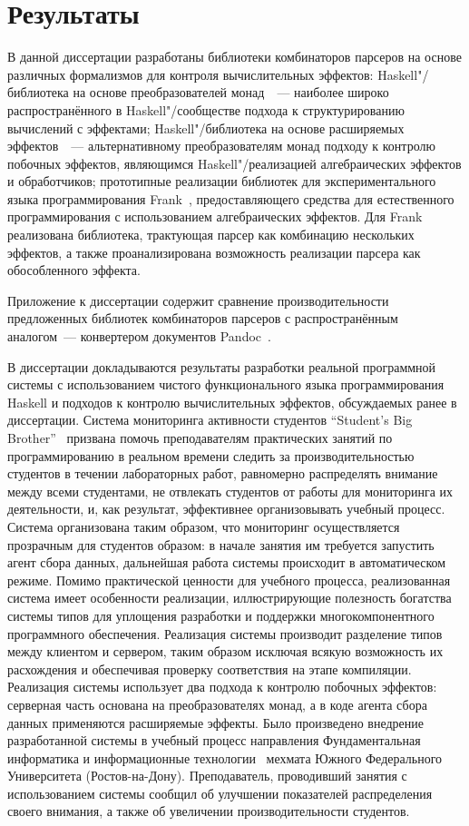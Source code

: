 \documentclass [fontsize=14pt, paper=a4, pagesize, DIV=calc]%
{article}
\begin{document}
\section{Результаты}

В данной диссертации разработаны библиотеки комбинаторов парсеров на основе
различных формализмов для контроля вычислительных эффектов: Haskell"/библиотека на
основе преобразователей монад~\cite{mdParse}~--- наиболее широко распространённого
в Haskell"/сообществе подхода к структурированию вычислений с эффектами; Haskell"/библиотека
на основе расширяемых эффектов~\cite{extEffParsers}~---
альтернативному преобразователям монад подходу к контролю
побочных эффектов, являющимся Haskell"/реализацией алгебраических эффектов и обработчиков;
прототипные реализации библиотек для экспериментального языка программирования
Frank~\cite{frankoparsec}, предоставляющего средства для естественного программирования
с использованием алгебраических эффектов. Для Frank реализована библиотека, трактующая
парсер как комбинацию нескольких эффектов, а также проанализирована возможность
реализации парсера как обособленного эффекта.

Приложение к диссертации содержит сравнение производительности
предложенных библиотек комбинаторов парсеров с распространённым аналогом~--- конвертером
документов Pandoc~\cite{pandoc}.

В диссертации докладываются результаты разработки реальной программной
системы с использованием чистого функционального языка программирования Haskell и
подходов к контролю вычислительных эффектов, обсуждаемых ранее в диссертации.
Система мониторинга активности студентов ``Student's Big Brother''~\cite{sbbRepo}
призвана помочь преподавателям практических занятий по программированию
в реальном времени следить за производительностью студентов в течении лабораторных
работ, равномерно распределять
внимание между всеми студентами, не отвлекать студентов от работы для мониторинга
их деятельности, и, как результат, эффективнее организовывать учебный процесс.
Система организована таким образом, что мониторинг осуществляется прозрачным для
студентов образом: в начале занятия им требуется запустить агент сбора данных, дальнейшая
работа системы происходит в автоматическом режиме. Помимо практической ценности для
учебного процесса, реализованная система имеет особенности реализации, иллюстрирующие
полезность богатства системы типов для уплощения разработки и поддержки многокомпонентного
программного обеспечения. Реализация системы производит разделение типов между клиентом
и сервером, таким образом исключая всякую возможность их расхождения и обеспечивая проверку
соответствия на этапе компиляции. Реализация системы использует два подхода к контролю побочных эффектов: серверная часть основана на преобразователях монад, а в коде агента сбора
данных применяются расширяемые эффекты. Было произведено внедрение разработанной системы
в учебный процесс направления Фундаментальная информатика и информационные
технологии~\cite{fiit} мехмата Южного Федерального Университета (Ростов-на-Дону).
Преподаватель, проводивший занятия с использованием системы сообщил об
улучшении показателей распределения своего внимания, а также об увеличении
производительности студентов.

\printbibliography[%
    heading=bibintoc%
    ,title=Библиография %
]
\end{document}
